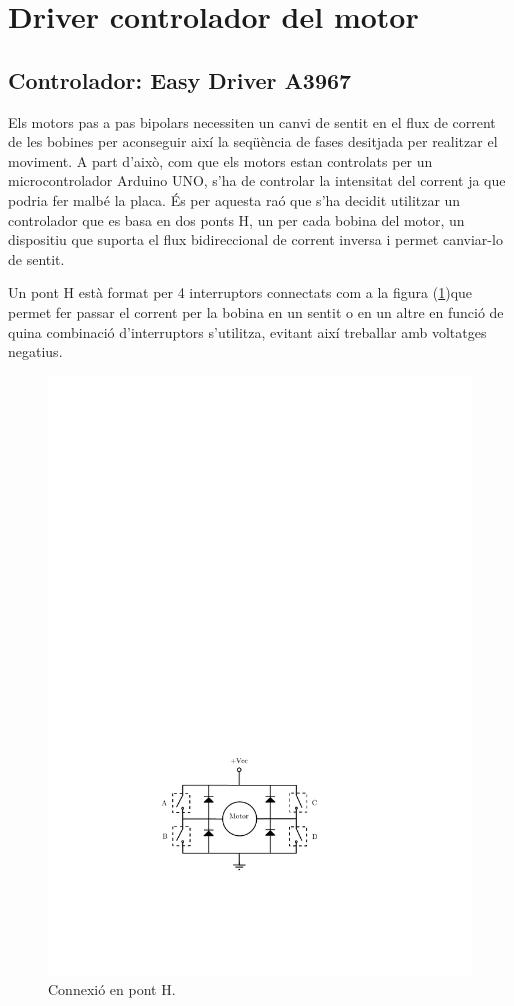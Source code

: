 \section {Driver controlador del motor}\label{sec:driver}

\subsection{Controlador: Easy Driver A3967}

Els motors pas a pas bipolars necessiten un canvi de sentit en el flux de corrent  de les bobines per aconseguir així la seqüència de fases desitjada per realitzar el moviment. A part d'això, com que els motors estan controlats per un microcontrolador Arduino UNO, s'ha de controlar la intensitat del corrent ja que podria fer malbé la placa. És per aquesta raó que s'ha decidit utilitzar un controlador que es basa en dos ponts H, un per cada bobina del motor, un dispositiu que suporta el flux bidireccional de corrent inversa i permet  canviar-lo de sentit.


Un pont H està format per 4 interruptors connectats com a la figura (\ref{fig:ponth})que permet fer passar el corrent per la bobina en un sentit o en un altre en funció de quina combinació d'interruptors s'utilitza, evitant així treballar amb voltatges negatius.

\begin{figure}[H]
	\centering
	\includegraphics{PontH}
	\caption{Connexió en pont H.}
	\label{fig:ponth}
\end{figure}

